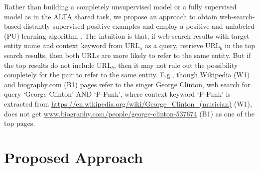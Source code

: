 \documentclass{sig-alternate-05-2015}
\begin{document}
% 
Rather than building a completely unsupervised model \cite{chisholm2016akbc, delgado2014data, nuray2009exploiting} or a fully supervised model as in the ALTA shared task, we propose an approach to obtain web-search-based distantly supervised positive examples and employ a positive and unlabeled (PU) learning algorithm \cite{Elkan:2008:LCO:1401890.1401920, liu2002partially}. The intuition is that, if web-search results with target entity name and context keyword from URL$_{a}$ as a query, retrieve  URL$_{b}$ in the top search results, then both URLs are more likely to refer to the same entity. But if the top results do not include URL$_{b}$, then it may not rule out the possibility completely for the pair to refer to the same entity. E.g., though Wikipedia (W1) and biography.com (B1) pages refer to the singer George Clinton, web search for query `George Clinton' AND `P-Funk', where context keyword `P-Funk' is extracted from \url{https://en.wikipedia.org/wiki/George_Clinton_(musician)} (W1), does not get \url{www.biography.com/people/george-clinton-537674} (B1) as one of the top pages. 

\section{Proposed Approach}
\end{document}
